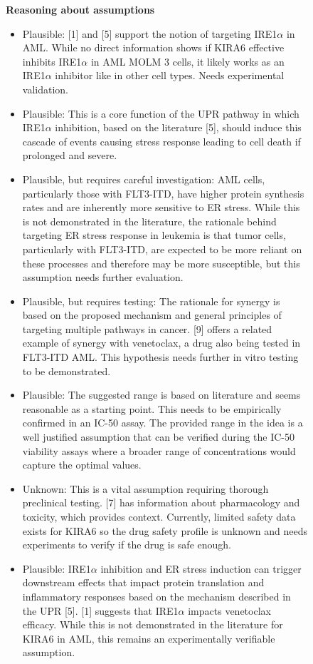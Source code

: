 \begin{figure}[htbp!]
\begin{tcolorbox}[
    colback=black!5!white,
    colframe=black!60!white,
    title=\textbf{KIRA6 for AML (continued)},
    fonttitle=\bfseries,
    arc=3mm,
    boxrule=1pt,
    bottomrule=2pt,
]
\textbf{Reasoning about assumptions}
\begin{itemize}
    \item Plausible: [1] and [5] support the notion of targeting IRE1$\alpha$ in AML. While no direct information shows if KIRA6 effective inhibits IRE1$\alpha$ in AML MOLM 3 cells,  it likely works as an IRE1$\alpha$ inhibitor like in other cell types. Needs experimental validation.
    \item Plausible: This is a core function of the UPR pathway in which IRE1$\alpha$ inhibition, based on the literature [5], should induce this cascade of events causing stress response leading to cell death if prolonged and severe.
    \item Plausible, but requires careful investigation: AML cells, particularly those with FLT3-ITD, have higher protein synthesis rates and are inherently more sensitive to ER stress. While this is not demonstrated in the literature, the rationale behind targeting ER stress response in leukemia is that tumor cells, particularly with FLT3-ITD, are expected to be more reliant on these processes and therefore may be more susceptible, but this assumption needs further evaluation.
    \item Plausible, but requires testing: The rationale for synergy is based on the proposed mechanism and general principles of targeting multiple pathways in cancer. [9] offers a related example of synergy with venetoclax, a drug also being tested in FLT3-ITD AML. This hypothesis needs further in vitro testing to be demonstrated.
    \item Plausible: The suggested range is based on literature and seems reasonable as a starting point. This needs to be empirically confirmed in an IC-50 assay. The provided range in the idea is a well justified assumption that can be verified during the IC-50 viability assays where a broader range of concentrations would capture the optimal values.
    \item Unknown: This is a vital assumption requiring thorough preclinical testing. [7] has information about pharmacology and toxicity, which provides context. Currently, limited safety data exists for KIRA6 so the drug safety profile is unknown and needs experiments to verify if the drug is safe enough.
    \item Plausible: IRE1$\alpha$ inhibition and ER stress induction can trigger downstream effects that impact protein translation and inflammatory responses based on the mechanism described in the UPR [5]. [1] suggests that IRE1$\alpha$ impacts venetoclax efficacy. While this is not demonstrated in the literature for KIRA6 in AML, this remains an experimentally verifiable assumption.
\end{itemize}


\end{tcolorbox}
\end{figure}
